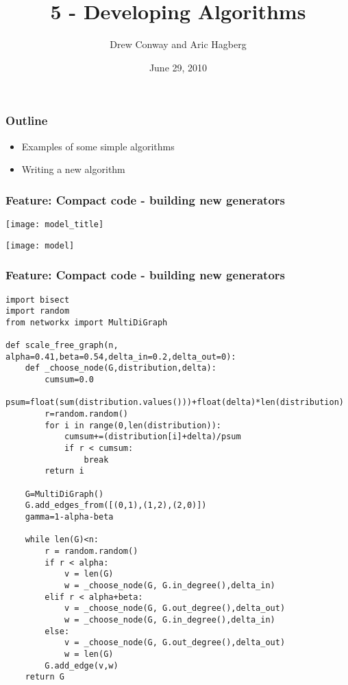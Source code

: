 \documentclass[xcolor=dvipsnames, 9pt]{beamer}
\title{5 - Developing Algorithms}
\author{Drew Conway and Aric Hagberg}
\date{June 29, 2010}
\begin{document}
\begin{frame}[plain]
\titlepage
\end{frame}

\begin{frame}
\frametitle{Outline}
\begin{itemize}
\item Examples of some simple algorithms
\item Writing a new algorithm
\end{itemize}
\end{frame}




\begin{frame}[fragile]
\frametitle{Feature: Compact code - building new generators}
\centerline{\texttt{[image: model\_title]}}
\centerline{\texttt{[image: model]}}
\end{frame}

\begin{frame}[fragile]
\frametitle{Feature: Compact code - building new generators}
\begin{block}{}
\tiny
\begin{lstlisting}
import bisect
import random
from networkx import MultiDiGraph

def scale_free_graph(n, alpha=0.41,beta=0.54,delta_in=0.2,delta_out=0):
    def _choose_node(G,distribution,delta):
        cumsum=0.0
        psum=float(sum(distribution.values()))+float(delta)*len(distribution)
        r=random.random()
        for i in range(0,len(distribution)):
            cumsum+=(distribution[i]+delta)/psum
            if r < cumsum:  
                break
        return i

    G=MultiDiGraph()
    G.add_edges_from([(0,1),(1,2),(2,0)])
    gamma=1-alpha-beta

    while len(G)<n:
        r = random.random()
        if r < alpha:
            v = len(G) 
            w = _choose_node(G, G.in_degree(),delta_in)
        elif r < alpha+beta:
            v = _choose_node(G, G.out_degree(),delta_out)
            w = _choose_node(G, G.in_degree(),delta_in)
        else:
            v = _choose_node(G, G.out_degree(),delta_out)
            w = len(G) 
        G.add_edge(v,w)
    return G

\end{lstlisting}
\end{block}
\end{frame}


\end{document}
